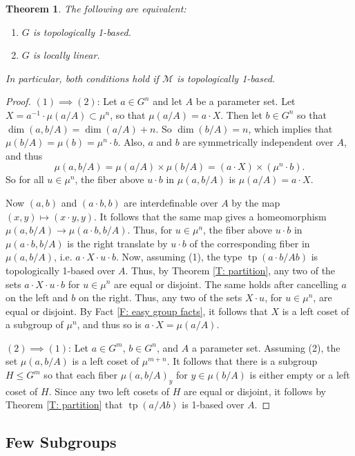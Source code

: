 \documentclass{amsart}
\newtheorem{theorem}{Theorem}[section]
\theoremstyle{definition}
\newcommand{\tp}{\operatorname{tp}}
\begin{document}
\begin{theorem}\label{T: loc lin}
     The following are equivalent:
    \begin{enumerate}
        \item $G$ is topologically 1-based.
        \item $G$ is locally linear.
    \end{enumerate}
    In particular, both conditions hold if $\mathcal M$ is topologically 1-based.
\end{theorem}
\begin{proof}
 $(1)\implies(2)$: Let $a\in G^n$ and let $A$ be a parameter set. Let $X=a^{-1}\cdot\mu(a/A)\subset\mu^n$, so that $\mu(a/A)=a\cdot X$. Then let $b\in G^n$ so that $\dim(a,b/A)=\dim(a/A)+n$. So $\dim(b/A)=n$, which implies that $\mu(b/
    A)=\mu(b)=\mu^n\cdot b$. Also, $a$ and $b$ are symmetrically independent over $A$, and thus $$\mu(a,b/A)=\mu(a/A)\times\mu(b/A)=(a\cdot X)\times(\mu^n\cdot b).$$ So for all $u\in\mu^n$, the fiber above $u\cdot b$ in $\mu(a,b/A)$ is $\mu(a/A)=a\cdot X$. 
    
    Now $(a,b)$ and $(a\cdot b,b)$ are interdefinable over $A$ by the map $(x,y)\mapsto(x\cdot y,y)$. It follows that the same map gives a homeomorphism $\mu(a,b/A)\rightarrow\mu(a\cdot b,b/A)$. Thus, for $u\in\mu^n$, the fiber above $u\cdot b$ in $\mu(a\cdot b,b/A)$ is the right translate by $u\cdot b$ of the corresponding fiber in $\mu(a,b/A)$, i.e. $a\cdot X\cdot u\cdot b$. Now, assuming (1), the type $\tp(a\cdot b/Ab)$ is topologically 1-based over $A$. Thus, by Theorem \ref{T: partition}, any two of the sets $a\cdot X\cdot u\cdot b$ for $u\in\mu^n$ are equal or disjoint. The same holds after cancelling $a$ on the left and $b$ on the right. Thus, any two of the sets $X\cdot u$, for $u\in\mu^n$, are equal or disjoint. By Fact \ref{F: easy group facts}, it follows that $X$ is a left coset of a subgroup of $\mu^n$, and thus so is $a\cdot X=\mu(a/A)$.

$(2)\implies(1)$: Let $a\in G^m$, $b\in G^n$, and $A$ a parameter set. Assuming (2), the set $\mu(a,b/A)$ is a left coset of $\mu^{m+n}$. It follows that there is a subgroup $H\leq G^m$ so that each fiber $\mu(a,b/A)_y$ for $y\in\mu(b/A)$ is either empty or a left coset of $H$. Since any two left cosets of $H$ are equal or disjoint, it follows by Theorem \ref{T: partition} that $\tp(a/Ab)$ is 1-based over $A$.
\end{proof}

\subsection{Few Subgroups}
\end{document}
